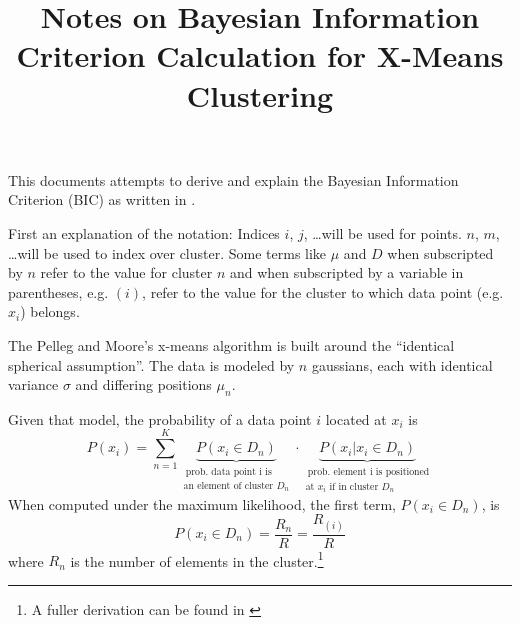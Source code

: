 \documentclass[letterpaper]{article}
\begin{document}
\title{Notes on Bayesian Information Criterion Calculation for X-Means Clustering}

\maketitle

This documents attempts to derive and explain the Bayesian Information
Criterion (BIC) as written in \cite{Pelleg2000}.

First an explanation of the notation: Indices $i$, $j$, \ldots will be
used for points.  $n$, $m$, \ldots will be used to index over cluster.
Some terms like $\mu$ and $D$ when subscripted by $n$ refer to the
value for cluster $n$ and when subscripted by a variable in
parentheses, e.g. $(i)$, refer to the value for the cluster to which
data point (e.g. $x_i$) belongs.

The Pelleg and Moore's x-means algorithm is built around the
``identical spherical assumption''.  The data is modeled by $n$
gaussians, each with identical variance $\sigma$ and differing
positions $\mu_n$.

Given that model, the probability of a data point $i$ located at $x_i$ is
%
\begin{equation}
  \label{eq:1}
  P(x_i) = \sum_{n=1}^K
               \underbrace{P(x_i \in D_n)}_{\substack{\
                  \text{prob.\ data point i is} \\
                  \text{an element of cluster $D_n$}}}
               \cdot \underbrace{P(x_i | x_i \in D_n)}_{\substack{\
                  \text{prob.\ element i is positioned} \\
                  \text{at $x_i$ if in cluster $D_n$}}}
\end{equation}
When computed under the maximum likelihood, the first term, $P(x_i
\in D_n)$, is
\begin{equation}
  \label{eq:2}
  P(x_i \in D_n) = \frac{R_n}{R} = \frac{R_{(i)}}{R}
\end{equation}
where $R_n$ is the number of elements in the cluster.\footnote{A
  fuller derivation can be found in \cite{DaumeIII2009}}


\end{document}
